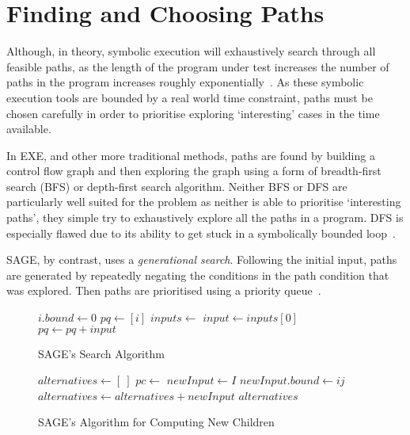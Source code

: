\documentclass[]{final_report}
\begin{document}
\section{Finding and Choosing Paths}

Although, in theory, symbolic execution will exhaustively search through all feasible paths, as the length of the program under test increases the number of paths in the program increases roughly exponentially~\cite{cadar2013symbolic}. As these symbolic execution tools are bounded by a real world time constraint, paths must be chosen carefully in order to prioritise exploring `interesting' cases in the time available.

In EXE, and other more traditional methods, paths are found by building a control flow graph and then exploring the graph using a form of breadth-first search (BFS) or depth-first search algorithm. Neither BFS or DFS are particularly well suited for the problem as neither is able to prioritise `interesting paths', they simple try to exhaustively explore all the paths in a program. DFS is especially flawed due to its ability to get stuck in a symbolically bounded loop~\cite{cadar2008exe}. 

SAGE, by contrast, uses a \textit{generational search}. Following the initial input, paths are generated by repeatedly negating the conditions in the path condition that was explored. Then paths are prioritised using a priority queue~\cite{godefroid2005dart}.

\begin{figure}[t]
\begin{algorithmic}
	\State $i.bound \gets 0$
	\State $pq \gets [i]$
	\State{}
		\State $inputs \gets$ 
			\State $input \gets inputs[0]$
			\State $pq \gets pq + input$
		\EndWhile
	\EndWhile
\EndFunction    
\end{algorithmic}
\caption{\label{fig:sage-search} SAGE's Search Algorithm}
\end{figure}

\begin{figure}[t]
\begin{algorithmic}
	\State $alternatives \gets [\ ]$
	\State $pc \gets$ 
			\State $newInput \gets I$
			\State $newInput.bound \gets ij$
			\State $alternatives \gets alternatives + newInput$
		\EndIf
	\EndFor
	\State \Return $alternatives$
\EndFunction    
\end{algorithmic}
\caption{\label{fig:sage-compute-new-children} SAGE's Algorithm for Computing New Children}
\end{figure}
\end{document}
